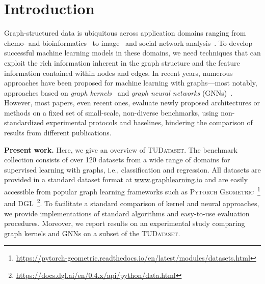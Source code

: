 \documentclass{article}
\newcommand{\xhdr}[1]{{\noindent\bfseries #1}}
\theoremstyle{definition}
\newcommand{\new}[1]{\emph{#1}}
\begin{document}
\section{Introduction}
Graph-structured data is ubiquitous across application domains ranging from chemo- and bioinformatics~\cite{Barabasi2004,Sto+2020} to image~\cite{Sim+2017} and social network analysis~\cite{Eas+2010}. To develop successful machine learning models in these domains, we need techniques that can exploit the rich information inherent in the graph structure and the feature information contained within nodes and edges. In recent years, numerous approaches have been proposed for machine learning with graphs---most notably, approaches based on \new{graph kernels}~\cite{Kri+2019} and \new{graph neural networks} (GNNs)~\cite{Sca+2009,Gil+2017}.
However, most papers, even recent ones, evaluate newly proposed architectures or methods on a fixed set of small-scale, non-diverse benchmarks, using non-standardized experimental protocols and baselines, hindering the comparison of results from different publications.



\xhdr{Present work.} 
Here, we give an overview of \textsc{TUDataset}. The benchmark collection consists of over 120 datasets from a wide range of domains for supervised learning with graphs, i.e., classification and regression. All datasets are provided in a standard dataset format at \url{www.graphlearning.io} and are easily accessible from popular graph learning frameworks such as \textsc{Pytorch Geometric}~\cite{Fey+2019}\footnote{\url{https://pytorch-geometric.readthedocs.io/en/latest/modules/datasets.html}} and \textsc{DGL}~\cite{Wan+2019}\footnote{\url{https://docs.dgl.ai/en/0.4.x/api/python/data.html}}. To facilitate a standard comparison of kernel and neural approaches, we provide implementations of standard algorithms and easy-to-use evaluation procedures. Moreover, we report results on an experimental study comparing graph kernels and GNNs on a subset of the \textsc{TUDataset}.
\end{document}
